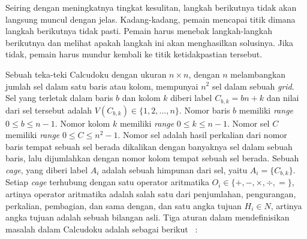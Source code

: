 Seiring dengan meningkatnya tingkat kesulitan, langkah berikutnya tidak akan langsung muncul dengan jelas. Kadang-kadang, pemain mencapai titik dimana langkah berikutnya tidak pasti. Pemain harus menebak langkah-langkah berikutnya dan melihat apakah langkah ini akan menghasilkan solusinya. Jika tidak, pemain harus mundur kembali ke titik ketidakpastian tersebut.

Sebuah teka-teki Calcudoku dengan ukuran \begin{math}n \times n\end{math}, dengan \begin{math}n\end{math} melambangkan jumlah sel dalam satu baris atau kolom, mempunyai \begin{math}n^2\end{math} sel dalam sebuah \textit{grid}. Sel yang terletak dalam baris \begin{math}b\end{math} dan kolom \begin{math}k\end{math} diberi label \begin{math}C_{b,k} = bn + k\end{math} dan nilai dari sel tersebut adalah \begin{math}V(C_{b,k}) \in \{1, 2, ..., n\}\end{math}. Nomor baris \begin{math}b\end{math} memiliki \textit{range} \begin{math}0 \leq b \leq n - 1\end{math}. Nomor kolom \begin{math}k\end{math} memiliki \textit{range} \begin{math}0 \leq k \leq n - 1\end{math}. Nomor sel \begin{math}C\end{math} memiliki \textit{range} \begin{math}0 \leq C \leq n^2 - 1\end{math}. Nomor sel adalah hasil perkalian dari nomor baris tempat sebuah sel berada dikalikan dengan banyaknya sel dalam sebuah baris, lalu dijumlahkan dengan nomor kolom tempat sebuah sel berada. Sebuah \textit{cage}, yang diberi label \begin{math}A_i\end{math} adalah sebuah himpunan dari sel, yaitu \begin{math}A_i = \{C_{b,k}\}\end{math}. Setiap \textit{cage} terhubung dengan satu operator aritmatika \begin{math}O_i \in \{+, -, \times, \div, =\}\end{math}, artinya operator aritmatika adalah salah satu dari penjumlahan, pengurangan, perkalian, pembagian, dan sama dengan, dan satu angka tujuan \begin{math}H_i \in N\end{math}, artinya angka tujuan adalah sebuah bilangan asli. Tiga aturan dalam mendefinisikan masalah dalam Calcudoku adalah sebagai berikut ~\cite{johanna:12:hybrid}:
